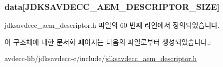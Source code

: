\subsubsection[{\texorpdfstring{data}{data}}]{ data\mbox{[}{\bf J\+D\+K\+S\+A\+V\+D\+E\+C\+C\+\_\+\+A\+E\+M\+\_\+\+D\+E\+S\+C\+R\+I\+P\+T\+O\+R\+\_\+\+S\+I\+ZE}\mbox{]}}\hypertarget{structjdksavdecc__descriptor_a6e05367d5486172eb279a52d69b7eea9}{}\label{structjdksavdecc__descriptor_a6e05367d5486172eb279a52d69b7eea9}


jdksavdecc\+\_\+aem\+\_\+descriptor.\+h 파일의 60 번째 라인에서 정의되었습니다.



이 구조체에 대한 문서화 페이지는 다음의 파일로부터 생성되었습니다.\+:\begin{DoxyCompactItemize}
\item 
avdecc-\/lib/jdksavdecc-\/c/include/\hyperlink{jdksavdecc__aem__descriptor_8h}{jdksavdecc\+\_\+aem\+\_\+descriptor.\+h}\end{DoxyCompactItemize}
